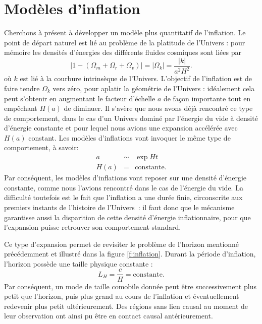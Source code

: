 \section{Modèles d'inflation}
Cherchons à présent à développer un modèle plus quantitatif de l'inflation. Le point de départ naturel est lié au problème de la platitude de l'Univers : pour mémoire les densités d'énergies des différents fluides cosmiques sont liées par 
\begin{equation}
|1-(\Omega_m+\Omega_r+\Omega_v)|=|\Omega_k|=\frac{|k|}{a^2H^2}.
\end{equation}
où $k$ est lié à la courbure intrinsèque de l'Univers. L'objectif de l'inflation est de faire tendre $\Omega_k$ vers zéro, pour aplatir la géométrie de l'Univers : idéalement cela peut s'obtenir en augmentant le facteur d'échelle $a$ de façon importante tout en empêchant $H(a)$ de diminuer. Il s'avère que nous avons déjà rencontré ce type de comportement, dans le cas d'un Univers dominé par l'énergie du vide à densité d'énergie constante et pour lequel nous avions une expansion accélérée avec $H(a)$ constant. Les modèles d'inflations vont invoquer le même type de comportement, à savoir:
\begin{eqnarray}
a&\sim&\exp{Ht}\\
H(a)&=&\mathrm{constante}.
\end{eqnarray} 
Par conséquent, les modèles d'inflations vont reposer sur une densité d'énergie constante, comme nous l'avions rencontré dans le cas de l'énergie du vide. La difficulté toutefois est le fait que l'inflation a une durée finie, circonscrite aux premiers instants de l'histoire de l'Univers~: il faut donc que le mécanisme garantisse aussi la disparition de cette densité d'énergie inflationnaire, pour que l'expansion puisse retrouver son comportement standard.

Ce type d'expansion permet de revisiter le problème de l'horizon mentionné précédemment et illustré dans la figure \ref{f:inflation}. Durant la période d'inflation, l'horizon possède une taille physique constante :
\begin{equation}
L_H=\frac{c}{H}=\mathrm{constante}.
\end{equation}
Par conséquent, un mode de taille comobile donnée peut être successivement plus petit que l'horizon, puis plus grand au cours de l'inflation et éventuellement redevenir plus petit ultérieurement. Des régions sans lien causal au moment de leur observation ont ainsi pu être en contact causal antérieurement.


